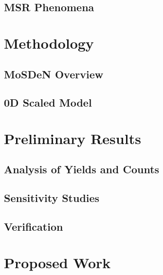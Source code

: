 \documentclass[9pt]{beamer}
\begin{document}
\subsection{MSR Phenomena}

%

\section{Methodology}
\subsection{MoSDeN Overview}





\subsection{0D Scaled Model}


\section{Preliminary Results}

\subsection{Analysis of Yields and Counts}


\subsection{Sensitivity Studies}




\subsection{Verification}


\section{Proposed Work}


\end{document}
